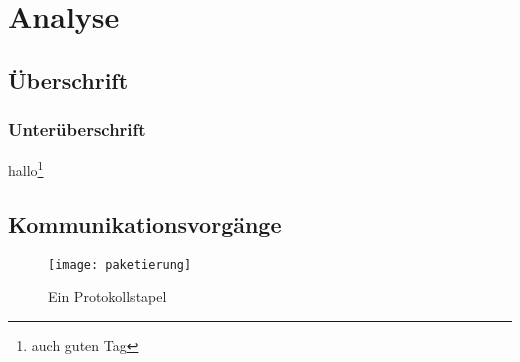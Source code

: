 \chapter{Analyse}

\section{Überschrift}

\subsection{Unterüberschrift}
\blindtext[2]
hallo\footnote{auch guten Tag}

\blindtext[1]

\section{Kommunikationsvorgänge}\label{sec:kommunikationsvorgange}

\begin{figure}
	\centering
	\texttt{[image: paketierung]}
	\caption{Ein Protokollstapel}
	\label{fig:paketierung}
\end{figure}
\blindtext[3]



